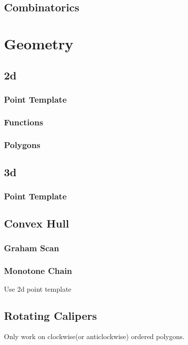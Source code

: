 \documentclass[10pt,a4paper]{report}
\begin{document}
	\section{Combinatorics}
	
\chapter{Geometry}
	\section{2d}
		\subsection{Point Template}
			
		\newpage
		\subsection{Functions}
			
		\newpage
		\subsection{Polygons}
			
	\newpage
	\section{3d}
		\subsection{Point Template}
			
	
	\newpage
	\section{Convex Hull}
		\subsection{Graham Scan}
		\newpage
		\subsection{Monotone Chain}
		Use 2d point template
			
	\newpage
	\section{Rotating Calipers}
		Only work on clockwise(or anticlockwise) ordered polygons.
		
\end{document}
